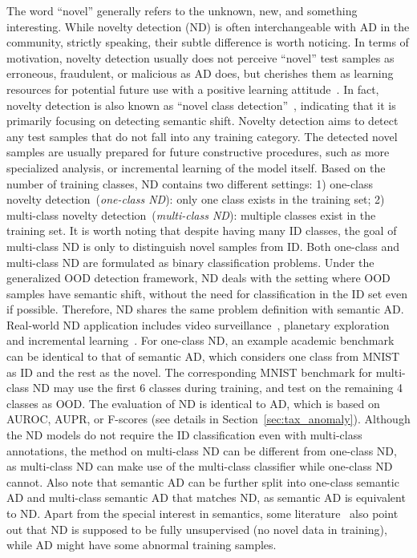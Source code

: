 \label{sec:tax_novelty}
The word ``novel'' generally refers to the unknown, new, and something interesting.
While novelty detection (ND) is often interchangeable with AD in the community, strictly speaking, their subtle difference is worth noticing.
In terms of motivation, novelty detection usually does not perceive ``novel'' test samples as erroneous, fraudulent, or malicious as AD does, but cherishes them as learning resources for potential future use with a positive learning attitude~. In fact, novelty detection is also known as ``novel class detection''~, indicating that it is primarily focusing on detecting semantic shift.
\smallskip
{}
Novelty detection aims to detect any test samples that do not fall into any training category.
The detected novel samples are usually prepared for future constructive procedures, such as more specialized analysis, or incremental learning of the model itself.
Based on the number of training classes, ND contains two different settings:
1) one-class novelty detection~(\emph{one-class ND}): only one class exists in the training set;
2) multi-class novelty detection~(\emph{multi-class ND}): multiple classes exist in the training set. It is worth noting that despite having many ID classes, the goal of multi-class ND is only to distinguish novel samples from ID. Both one-class and multi-class ND are formulated as binary classification problems.
\smallskip
{}
Under the generalized OOD detection framework, ND deals with the setting where OOD samples have semantic shift, without the need for classification in the ID set even if possible.
Therefore, ND shares the same problem definition with semantic AD.
\smallskip
{}
Real-world ND application includes video surveillance~, planetary exploration~ and incremental learning~.
For one-class ND, an example academic benchmark can be identical to that of semantic AD, which considers one class from MNIST as ID and the rest as the novel.
The corresponding MNIST benchmark for multi-class ND may use the first 6 classes during training, and test on the remaining 4 classes as OOD.
\smallskip
{}
The evaluation of ND is identical to AD, which is based on AUROC, AUPR, or F-scores (see details in Section~\ref{sec:tax_anomaly}). 
\smallskip
{} Although the ND models do not require the ID classification even with multi-class annotations, the method on multi-class ND can be different from one-class ND, as multi-class ND can make use of the multi-class classifier while one-class ND cannot.
Also note that semantic AD can be further split into one-class semantic AD and multi-class semantic AD that matches ND, as semantic AD is equivalent to ND.
\smallskip
{}
Apart from the special interest in semantics, some literature~ also point out that ND is supposed to be fully unsupervised (no novel data in training), while AD might have some abnormal training samples. 

